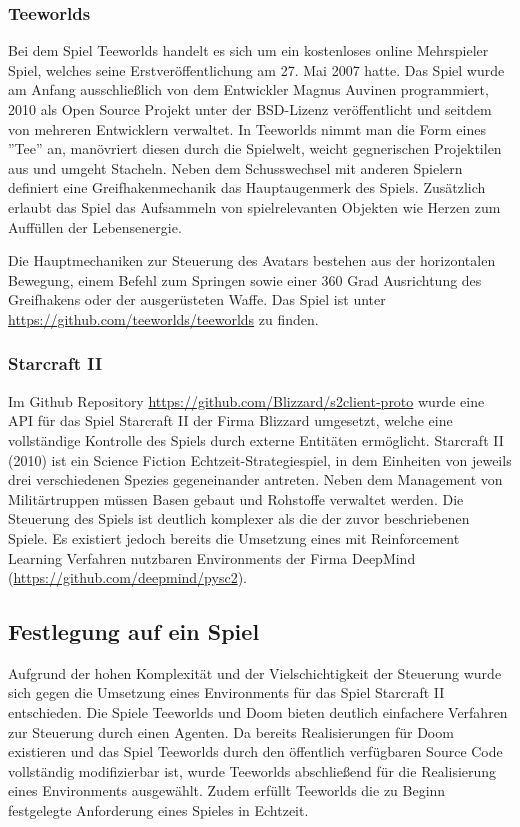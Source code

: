 \documentclass[11pt]{scrartcl}
\begin{document}
\newpage
\subsubsection{Teeworlds}
Bei dem Spiel Teeworlds handelt es sich um ein kostenloses online Mehrspieler Spiel, welches seine
Erstveröffentlichung am 27. Mai 2007 hatte. Das Spiel wurde am Anfang ausschließlich von dem
Entwickler Magnus Auvinen programmiert, 2010 als Open Source Projekt unter der BSD-Lizenz
veröffentlicht und seitdem von mehreren Entwicklern verwaltet. In Teeworlds nimmt man die Form
eines ''Tee'' an, manövriert diesen durch die Spielwelt, weicht gegnerischen Projektilen aus und
umgeht Stacheln. Neben dem Schusswechsel mit anderen Spielern definiert eine Greifhakenmechanik das
Hauptaugenmerk des Spiels. Zusätzlich erlaubt das Spiel das Aufsammeln von spielrelevanten Objekten
wie Herzen zum Auffüllen der Lebensenergie.

Die Hauptmechaniken zur Steuerung des Avatars bestehen aus der horizontalen Bewegung, einem Befehl
zum Springen sowie einer 360 Grad Ausrichtung des Greifhakens oder der ausgerüsteten Waffe.
Das Spiel ist unter \url{https://github.com/teeworlds/teeworlds} zu finden.

\subsubsection{Starcraft II}
Im Github Repository \url{https://github.com/Blizzard/s2client-proto} wurde eine API für das Spiel
Starcraft II der Firma Blizzard umgesetzt, welche eine vollständige Kontrolle des Spiels durch
externe Entitäten ermöglicht. Starcraft II (2010) ist ein Science Fiction Echtzeit-Strategiespiel,
in dem Einheiten von jeweils drei verschiedenen Spezies gegeneinander antreten. Neben dem
Management von Militärtruppen müssen Basen gebaut und Rohstoffe verwaltet werden. Die Steuerung
des Spiels ist deutlich komplexer als die der zuvor beschriebenen Spiele. Es existiert jedoch
bereits die Umsetzung eines mit Reinforcement Learning Verfahren nutzbaren Environments der Firma
DeepMind (\url{https://github.com/deepmind/pysc2}). 

\subsection{Festlegung auf ein Spiel}
Aufgrund der hohen Komplexität und der Vielschichtigkeit der Steuerung wurde sich gegen die Umsetzung
eines Environments für das Spiel Starcraft II entschieden. Die Spiele Teeworlds und Doom bieten
deutlich einfachere Verfahren zur Steuerung durch einen Agenten. Da bereits Realisierungen für Doom
existieren und das Spiel Teeworlds durch den öffentlich verfügbaren Source Code vollständig modifizierbar
ist, wurde Teeworlds abschließend für die Realisierung eines Environments ausgewählt. Zudem erfüllt
Teeworlds die zu Beginn festgelegte Anforderung eines Spieles in Echtzeit.
\end{document}
